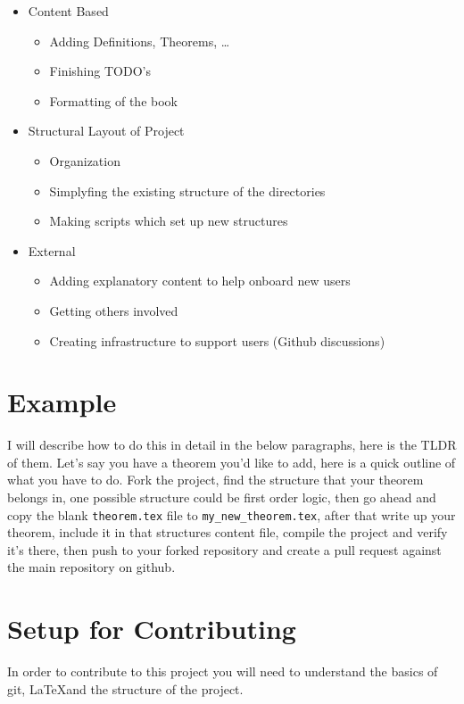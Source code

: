 \begin{itemize}
  \item Content Based 
  \begin{itemize}
      \item Adding Definitions, Theorems, \ldots
      \item Finishing TODO's
      \item Formatting of the book
  \end{itemize}
  \item Structural Layout of Project 
  \begin{itemize}
      \item Organization
      \item Simplyfing the existing structure of the directories 
      \item Making scripts which set up new structures
  \end{itemize}
  \item External
  \begin{itemize}
      \item Adding explanatory content to help onboard new users
      \item Getting others involved
      \item Creating infrastructure to support users (Github discussions)
  \end{itemize}
\end{itemize}

\section*{Example}
I will describe how to do this in detail in the below paragraphs, here is the TLDR of them. Let's say you have a theorem you'd like to add, here is a quick outline of what you have to do. Fork the project,  find the structure that your theorem belongs in, one possible structure could be first order logic, then go ahead and copy the blank \texttt{theorem.tex} file to \texttt{my\_new\_theorem.tex}, after that write up your theorem, include it in that structures content file, compile the project and verify it's there, then push to your forked repository and create a pull request against the main repository on github.

\section*{Setup for Contributing}
In order to contribute to this project you will need to understand the basics of git, \LaTeX and the structure of the project.

